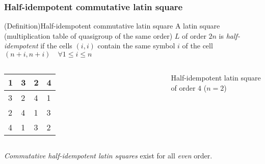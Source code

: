 \begin{frame}
\frametitle{Half-idempotent commutative latin square}

\begin{block}{(Definition)Half-idempotent commutative latin square}
A latin square (multiplication table of quasigroup of the same order) $L$ of order $2n$ is \textit{half-idempotent} if the cells $(i,i)$ contain the same symbol $i$ of the cell $(n+i,n+i)\quad \forall 1 \le i \le n$
\end{block}
\begin{columns}
	
	\begin{table}
		\centering
		\begin{tabular}{|l|l|l|l|} 
			\hline
			1 & 3 & 2 & 4  \\ 
			\hline
			3 & 2 & 4 & 1  \\ 
			\hline
			2 & 4 & 1 & 3  \\ 
			\hline
			4 & 1 & 3 & 2  \\
			\hline
		\end{tabular}
	\end{table}
	Half-idempotent latin square of order $4$ ($n=2$)
	
\end{columns}

\pause
{}
\begin{block}{}
	\textit{Commutative half-idempotent latin squares} exist for all \textit{even} order.
\end{block}

\end{frame}


